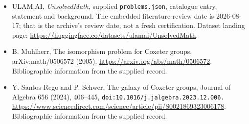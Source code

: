 \documentclass[11pt,a4paper]{article}
\begin{document}
{\small

\begin{itemize}

\item[\hypertarget{source:statement:1}{S1}] ULAM.AI, \emph{UnsolvedMath}, supplied \texttt{problems.json}, catalogue entry, statement and background. The embedded literature-review date is 2026-08-17; that is the archive’s review date, not a fresh certification. Dataset landing page: \url{https://huggingface.co/datasets/ulamai/UnsolvedMath}.

\item[\hypertarget{source:statement:2}{S2}] B. Muhlherr, The isomorphism problem for Coxeter groups, arXiv:math/0506572 (2005). \url{https://arxiv.org/abs/math/0506572}. Bibliographic information from the supplied record.

\item[\hypertarget{source:statement:3}{S3}] Y. Santos Rego and P. Schwer, The galaxy of Coxeter groups, Journal of Algebra 656 (2024), 406--445, \nolinkurl{doi:10.1016/j.jalgebra.2023.12.006.} \url{https://www.sciencedirect.com/science/article/pii/S0021869323006178}. Bibliographic information from the supplied record.

\end{itemize}

}

\label{end:statement}
\end{document}
